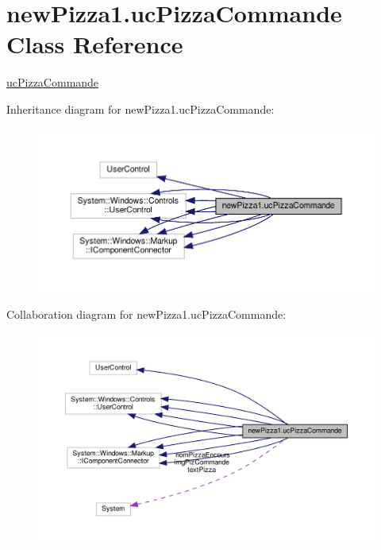\hypertarget{classnewPizza1_1_1ucPizzaCommande}{}\section{new\+Pizza1.\+uc\+Pizza\+Commande Class Reference}
\label{classnewPizza1_1_1ucPizzaCommande}


\hyperlink{classnewPizza1_1_1ucPizzaCommande}{uc\+Pizza\+Commande}  




Inheritance diagram for new\+Pizza1.\+uc\+Pizza\+Commande\+:
\nopagebreak
\begin{figure}[H]
\begin{center}
\leavevmode
\includegraphics[width=350pt]{classnewPizza1_1_1ucPizzaCommande__inherit__graph}
\end{center}
\end{figure}


Collaboration diagram for new\+Pizza1.\+uc\+Pizza\+Commande\+:
\nopagebreak
\begin{figure}[H]
\begin{center}
\leavevmode
\includegraphics[width=350pt]{classnewPizza1_1_1ucPizzaCommande__coll__graph}
\end{center}
\end{figure}
